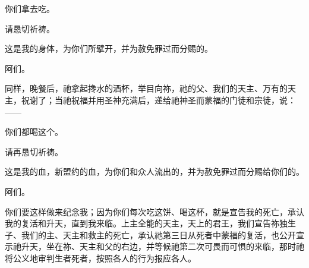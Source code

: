 \par

你们拿去吃。\par

\par

请恳切祈祷。\par

\par

这是我的身体，为你们所擘开，并为赦免罪过而分赐的。\par

\par

阿们。\par

\par

同样，晚餐后，祂拿起搀水的酒杯，举目向祢，祂的父、我们的天主、万有的天主，祝谢了；当祂祝福并用圣神充满后，递给祂神圣而蒙福的门徒和宗徒，说：——\par

\par

你们都喝这个。\par

\par

请再恳切祈祷。\par

\par

这是我的血，新盟约的血，为你们和众人流出的，并为赦免罪过而分赐给你们的。\par

\par

阿们。\par

\par

你们要这样做来纪念我；因为你们每次吃这饼、喝这杯，就是宣告我的死亡，承认我的复活和升天，直到我来临。上主全能的天主，天上的君王，我们宣告祢独生子、我们的主、天主和救主的死亡，承认祂第三日从死者中蒙福的复活，也公开宣示祂升天，坐在祢、天主和父的右边，并等候祂第二次可畏而可惧的来临，那时祂将公义地审判生者死者，按照各人的行为报应各人。\par

